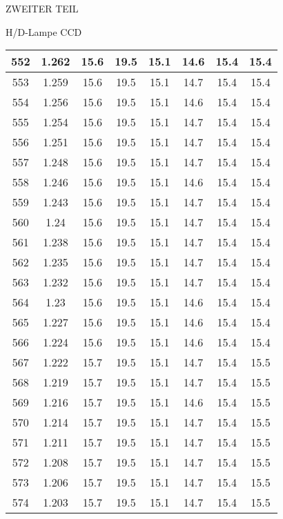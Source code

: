 \begin{appendix}
\begin{chapter}{ZWEITER TEIL}
\begin{section}{H/D-Lampe CCD}
\begin{scriptsize}
\begin{longtable}[htbp]{|c|c|c|c|c|c|c|c|}
            552 & 1.262 & 15.6 & 19.5 & 15.1 & 14.6 & 15.4 & 15.4 \\ \hline
            553 & 1.259 & 15.6 & 19.5 & 15.1 & 14.7 & 15.4 & 15.4 \\ \hline
            554 & 1.256 & 15.6 & 19.5 & 15.1 & 14.6 & 15.4 & 15.4 \\ \hline
            555 & 1.254 & 15.6 & 19.5 & 15.1 & 14.7 & 15.4 & 15.4 \\ \hline
            556 & 1.251 & 15.6 & 19.5 & 15.1 & 14.7 & 15.4 & 15.4 \\ \hline
            557 & 1.248 & 15.6 & 19.5 & 15.1 & 14.7 & 15.4 & 15.4 \\ \hline
            558 & 1.246 & 15.6 & 19.5 & 15.1 & 14.6 & 15.4 & 15.4 \\ \hline
            559 & 1.243 & 15.6 & 19.5 & 15.1 & 14.7 & 15.4 & 15.4 \\ \hline
            560 & 1.24 & 15.6 & 19.5 & 15.1 & 14.7 & 15.4 & 15.4 \\ \hline
            561 & 1.238 & 15.6 & 19.5 & 15.1 & 14.7 & 15.4 & 15.4 \\ \hline
            562 & 1.235 & 15.6 & 19.5 & 15.1 & 14.7 & 15.4 & 15.4 \\ \hline
            563 & 1.232 & 15.6 & 19.5 & 15.1 & 14.7 & 15.4 & 15.4 \\ \hline
            564 & 1.23 & 15.6 & 19.5 & 15.1 & 14.6 & 15.4 & 15.4 \\ \hline
            565 & 1.227 & 15.6 & 19.5 & 15.1 & 14.6 & 15.4 & 15.4 \\ \hline
            566 & 1.224 & 15.6 & 19.5 & 15.1 & 14.6 & 15.4 & 15.4 \\ \hline
            567 & 1.222 & 15.7 & 19.5 & 15.1 & 14.7 & 15.4 & 15.5 \\ \hline
            568 & 1.219 & 15.7 & 19.5 & 15.1 & 14.7 & 15.4 & 15.5 \\ \hline
            569 & 1.216 & 15.7 & 19.5 & 15.1 & 14.6 & 15.4 & 15.5 \\ \hline
            570 & 1.214 & 15.7 & 19.5 & 15.1 & 14.7 & 15.4 & 15.5 \\ \hline
            571 & 1.211 & 15.7 & 19.5 & 15.1 & 14.7 & 15.4 & 15.5 \\ \hline
            572 & 1.208 & 15.7 & 19.5 & 15.1 & 14.7 & 15.4 & 15.5 \\ \hline
            573 & 1.206 & 15.7 & 19.5 & 15.1 & 14.7 & 15.4 & 15.5 \\ \hline
            574 & 1.203 & 15.7 & 19.5 & 15.1 & 14.7 & 15.4 & 15.5 \\ \hline

\end{longtable}
\end{scriptsize}
\end{section}
\end{chapter}
\end{appendix}
